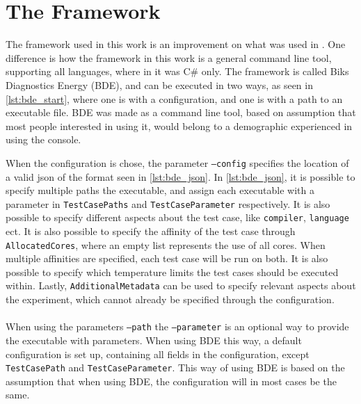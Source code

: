 \section{The Framework}\label{app:framework}

The framework used in this work is an improvement on what was used in \cite{biksbois}. One difference is how the framework in this work is a general command line tool, supporting all languages, where in \cite{biksbois} it was C\# only. The framework is called Biks Diagnostics Energy (BDE), and can be executed in two ways, as seen in \cref{lst:bde_start}, where one is with a configuration, and one is with a path to an executable file. BDE was made as a command line tool, based on assumption that most people interested in using it, would belong to a demographic experienced in using the console.



When the configuration is chose, the parameter \texttt{--config} specifies the location of a valid json of the format seen in \cref{lst:bde_json}. In \cref{lst:bde_json}, it is possible to specify multiple paths the executable, and assign each executable with a parameter in \texttt{TestCasePaths} and \texttt{TestCaseParameter} respectively. It is also possible to specify different aspects about the test case, like \texttt{compiler}, \texttt{language} ect. It is also possible to specify the affinity of the test case through \texttt{AllocatedCores}, where an empty list represents the use of all cores. When multiple affinities are specified, each test case will be run on both. It is also possible to specify which temperature limits the test cases should be executed within. Lastly, \texttt{AdditionalMetadata} can be used to specify relevant aspects about the experiment, which cannot already be specified through the configuration.



\paragraph*{}
When using the parameters \texttt{--path} the \texttt{--parameter} is an optional way to provide the executable with parameters. When using BDE this way, a default configuration is set up, containing all fields in the configuration, except \texttt{TestCasePath} and \texttt{TestCaseParameter}. This way of using BDE is based on the assumption that when using BDE, the configuration will in most cases be the same.
\newpage

